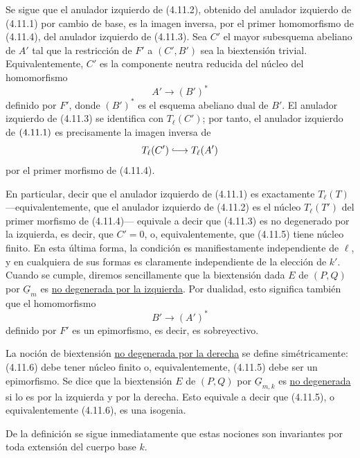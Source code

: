 Se sigue que el anulador izquierdo de (4.11.2), obtenido del anulador
izquierdo de (4.11.1) por cambio de base, es la imagen inversa, por el
primer homomorfismo de (4.11.4), del anulador izquierdo de (4.11.3).
Sea $C'$ el mayor subesquema abeliano de $A'$ tal que la restricción de
$F'$ a $(C',B')$ sea la biextensión trivial. Equivalentemente, $C'$ es
la componente neutra reducida del núcleo del homomorfismo
\begin{equation}\tag{4.11.5}
 A'\longrightarrow(B')^*
\end{equation}
definido por $F'$, donde $(B')^*$ es el esquema abeliano dual de $B'$.
El anulador izquierdo de (4.11.3) se identifica con $T_\ell(C')$; por
tanto, el anulador izquierdo de
$(\sisi{1.11.1}{4.11.1})$ es precisamente la imagen inversa de
\[
 T_\ell(C')\lhook\joinrel\longrightarrow T_\ell(A')
\]
por el primer morfismo de (4.11.4).

En particular, decir que el anulador izquierdo de (4.11.1) es
exactamente $T_\ell(T)$ —equivalentemente, que el anulador izquierdo de
(4.11.2) es el núcleo $T_\ell(T')$ del primer morfismo de (4.11.4)—
equivale a decir que (4.11.3) es no degenerado por la izquierda, es
decir, que $C'=0$, o, equivalentemente, que (4.11.5) tiene núcleo
finito. En esta última forma, la condición es manifiestamente
independiente de $\ell$, y en cualquiera de sus formas es claramente
independiente de la elección de $k'$. Cuando se cumple, diremos
sencillamente que la biextensión dada $E$ de $(P,Q)$ por
$\underline G_m$ es \underline{no degenerada por la izquierda}. Por
dualidad, esto significa también que el homomorfismo
\begin{equation}\tag{4.11.6}
 B'\longrightarrow(A')^*
\end{equation}
definido por $F'$ es un epimorfismo, es decir, es sobreyectivo.


La noción de biextensión \underline{no degenerada por la derecha} se
define simétricamente: (4.11.6) debe tener núcleo finito o,
equivalentemente, (4.11.5) debe ser un epimorfismo. Se dice que la
biextensión $E$ de $(P,Q)$ por $\underline G_{m,k}$ es
\underline{no degenerada} si lo es por la izquierda y por la derecha.
Esto equivale a decir que (4.11.5), o equivalentemente (4.11.6), es una
isogenia.

De la definición se sigue inmediatamente que estas nociones son
invariantes por toda extensión del cuerpo base $k$.
